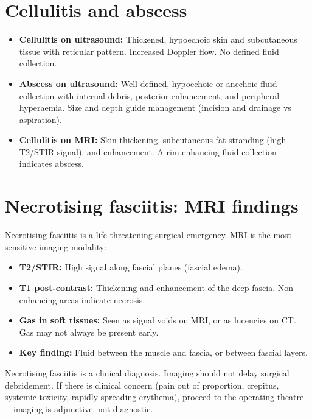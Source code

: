 \section{Cellulitis and abscess}
\begin{itemize}
    \item \textbf{Cellulitis on ultrasound:} Thickened, hypoechoic skin and subcutaneous tissue with reticular pattern. Increased Doppler flow. No defined fluid collection.
    \item \textbf{Abscess on ultrasound:} Well-defined, hypoechoic or anechoic fluid collection with internal debris, posterior enhancement, and peripheral hyperaemia. Size and depth guide management (incision and drainage vs aspiration).
    \item \textbf{Cellulitis on MRI:} Skin thickening, subcutaneous fat stranding (high T2/STIR signal), and enhancement. A rim-enhancing fluid collection indicates abscess.
\end{itemize}

\section{Necrotising fasciitis: MRI findings}
Necrotising fasciitis is a life-threatening surgical emergency. MRI is the most sensitive imaging modality:
\begin{itemize}
    \item \textbf{T2/STIR:} High signal along fascial planes (fascial edema).
    \item \textbf{T1 post-contrast:} Thickening and enhancement of the deep fascia. Non-enhancing areas indicate necrosis.
    \item \textbf{Gas in soft tissues:} Seen as signal voids on MRI, or as lucencies on CT. Gas may not always be present early.
    \item \textbf{Key finding:} Fluid between the muscle and fascia, or between fascial layers.
\end{itemize}

\begin{pearlbox}
Necrotising fasciitis is a clinical diagnosis. Imaging should not delay surgical debridement. If there is clinical concern (pain out of proportion, crepitus, systemic toxicity, rapidly spreading erythema), proceed to the operating theatre---imaging is adjunctive, not diagnostic.
\end{pearlbox}

